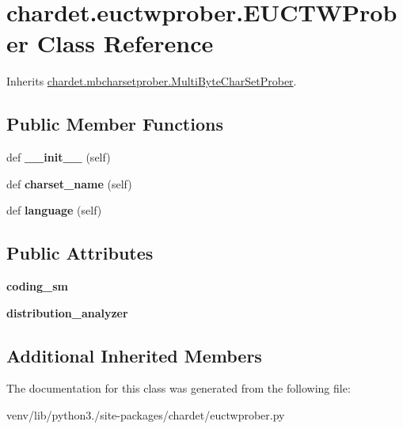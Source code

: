 \hypertarget{classchardet_1_1euctwprober_1_1_e_u_c_t_w_prober}{}\section{chardet.\+euctwprober.\+E\+U\+C\+T\+W\+Prober Class Reference}
\label{classchardet_1_1euctwprober_1_1_e_u_c_t_w_prober}


Inherits \hyperlink{classchardet_1_1mbcharsetprober_1_1_multi_byte_char_set_prober}{chardet.\+mbcharsetprober.\+Multi\+Byte\+Char\+Set\+Prober}.

\subsection*{Public Member Functions}
\begin{DoxyCompactItemize}
\item 
\mbox{\label{classchardet_1_1euctwprober_1_1_e_u_c_t_w_prober_a9f36970ba95bf82d9dcc6af4d4b17be6}} 
def {\bfseries \+\_\+\+\_\+init\+\_\+\+\_\+} (self)
\item 
\mbox{\label{classchardet_1_1euctwprober_1_1_e_u_c_t_w_prober_a0ce74f0f63cc08b0714e849917da4207}} 
def {\bfseries charset\+\_\+name} (self)
\item 
\mbox{\label{classchardet_1_1euctwprober_1_1_e_u_c_t_w_prober_ae17943dfbb01a4cbad6f306c88339d72}} 
def {\bfseries language} (self)
\end{DoxyCompactItemize}
\subsection*{Public Attributes}
\begin{DoxyCompactItemize}
\item 
\mbox{\label{classchardet_1_1euctwprober_1_1_e_u_c_t_w_prober_a103cf6a7d0ecda206f1a4ca9bd4b71aa}} 
{\bfseries coding\+\_\+sm}
\item 
\mbox{\label{classchardet_1_1euctwprober_1_1_e_u_c_t_w_prober_a059608be16f35b198beb7a35e97cbd48}} 
{\bfseries distribution\+\_\+analyzer}
\end{DoxyCompactItemize}
\subsection*{Additional Inherited Members}


The documentation for this class was generated from the following file\+:\begin{DoxyCompactItemize}
\item 
venv/lib/python3./site-\/packages/chardet/euctwprober.\+py\end{DoxyCompactItemize}
